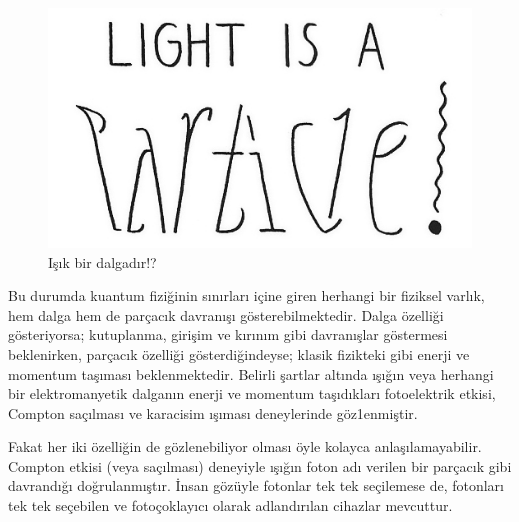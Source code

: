 \documentclass[a4paper,12pt, twoside]{article}
\begin{document}
\begin{figure}[hbtp]
\center
\includegraphics[scale=.5]{Wave-particle.png}
\caption{Işık bir dalgadır!?}
\label{fig:light_is_a_wave}
\end{figure}

Bu durumda kuantum fiziğinin sınırları içine giren herhangi bir fiziksel varlık, hem dalga hem de parçacık davranışı gösterebilmektedir. Dalga özelliği gösteriyorsa; kutuplanma, girişim ve kırınım gibi davranışlar göstermesi beklenirken, parçacık özelliği gösterdiğindeyse; klasik fizikteki gibi enerji ve momentum taşıması beklenmektedir. Belirli şartlar altında ışığın veya herhangi bir elektromanyetik dalganın enerji ve momentum taşıdıkları fotoelektrik etkisi, Compton saçılması ve karacisim ışıması deneylerinde göz1enmiştir.

Fakat her iki özelliğin de gözlenebiliyor olması öyle kolayca anlaşılamayabilir. Compton etkisi (veya saçılması) deneyiyle ışığın foton adı verilen bir parçacık gibi davrandığı doğrulanmıştır. İnsan gözüyle fotonlar tek tek seçilemese de, fotonları tek tek seçebilen ve fotoçoklayıcı \cite{book:Gasiorowicz} olarak adlandırılan cihazlar mevcuttur. 
\end{document}
